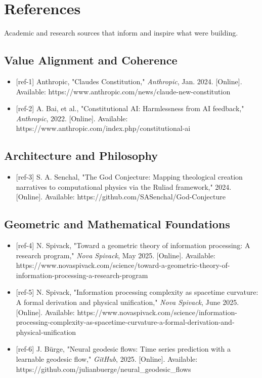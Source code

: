 \documentclass[12pt,a4paper]{article}
\providecommand{\tightlist}{\setlength{\itemsep}{0pt}\setlength{\parskip}{0pt}}
\begin{document}
\section{References}\label{references}

Academic and research sources that inform and inspire what
we\textquotesingle re building.

\subsection{Value Alignment and
Coherence}\label{value-alignment-and-coherence}

\begin{itemize}
\tightlist
\item
  {[}ref-1{]} Anthropic, "Claude\textquotesingle s Constitution,"
  \emph{Anthropic}, Jan. 2024. {[}Online{]}. Available:
  https://www.anthropic.com/news/claude-new-constitution
\item
  {[}ref-2{]} A. Bai, et al., "Constitutional AI: Harmlessness from AI
  feedback," \emph{Anthropic}, 2022. {[}Online{]}. Available:
  https://www.anthropic.com/index.php/constitutional-ai
\end{itemize}

\subsection{Architecture and
Philosophy}\label{architecture-and-philosophy}

\begin{itemize}
\tightlist
\item
  {[}ref-3{]} S. A. Senchal, "The God Conjecture: Mapping theological
  creation narratives to computational physics via the Ruliad
  framework," 2024. {[}Online{]}. Available:
  https://github.com/SASenchal/God-Conjecture
\end{itemize}

\subsection{Geometric and Mathematical
Foundations}\label{geometric-and-mathematical-foundations}

\begin{itemize}
\tightlist
\item
  {[}ref-4{]} N. Spivack, "Toward a geometric theory of information
  processing: A research program," \emph{Nova Spivack}, May 2025.
  {[}Online{]}. Available:
  https://www.novaspivack.com/science/toward-a-geometric-theory-of-information-processing-a-research-program
\item
  {[}ref-5{]} N. Spivack, "Information processing complexity as
  spacetime curvature: A formal derivation and physical unification,"
  \emph{Nova Spivack}, June 2025. {[}Online{]}. Available:
  https://www.novaspivack.com/science/information-processing-complexity-as-spacetime-curvature-a-formal-derivation-and-physical-unification
\item
  {[}ref-6{]} J. Bürge, "Neural geodesic flows: Time series prediction
  with a learnable geodesic flow," \emph{GitHub}, 2025. {[}Online{]}.
  Available: https://github.com/julianbuerge/neural\_geodesic\_flows
\end{itemize}
\end{document}
